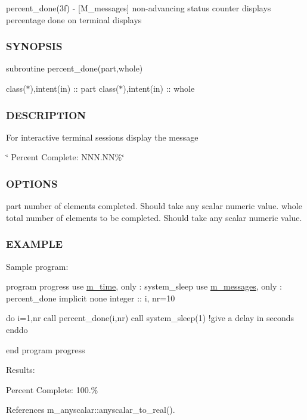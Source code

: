 percent\+\_\+done(3f) -\/ \mbox{[}M\+\_\+messages\mbox{]} non-\/advancing status counter displays percentage done on terminal displays 

\subsubsection*{S\+Y\+N\+O\+P\+S\+IS}

subroutine percent\+\_\+done(part,whole)

class($\ast$),intent(in) \+:\+: part class($\ast$),intent(in) \+:\+: whole

\subsubsection*{D\+E\+S\+C\+R\+I\+P\+T\+I\+ON}

For interactive terminal sessions display the message

\char`\"{} Percent Complete\+: N\+N\+N.\+N\+N\%\char`\"{}

\subsubsection*{O\+P\+T\+I\+O\+NS}

part number of elements completed. Should take any scalar numeric value. whole total number of elements to be completed. Should take any scalar numeric value.

\subsubsection*{E\+X\+A\+M\+P\+LE}

Sample program\+:

program progress use \hyperlink{namespacem__time}{m\+\_\+time}, only \+: system\+\_\+sleep use \hyperlink{namespacem__messages}{m\+\_\+messages}, only \+: percent\+\_\+done implicit none integer \+:\+: i, nr=10

do i=1,nr call percent\+\_\+done(i,nr) call system\+\_\+sleep(1) !give a delay in seconds enddo

end program progress

Results\+:

Percent Complete\+: 100.\% 

References m\+\_\+anyscalar\+::anyscalar\+\_\+to\+\_\+real().

